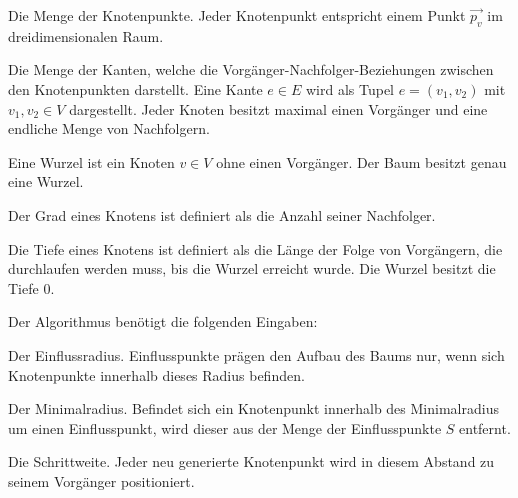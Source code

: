 \begin{description}[labelindent]
	\item[\boldmath$V$] Die Menge der Knotenpunkte. Jeder Knotenpunkt entspricht einem Punkt $\overrightarrow{p_v}$ im dreidimensionalen Raum. \cite[S.358]{ThI:14}\\
	
	\item[\boldmath$E$] Die Menge der Kanten, welche die Vorgänger-Nachfolger-Beziehungen zwischen den Knotenpunkten darstellt. Eine Kante $e \in E$ wird als Tupel $e = (v_1, v_2)$ mit $v_1, v_2 \in V$ dargestellt. Jeder Knoten besitzt maximal einen Vorgänger und eine endliche Menge von Nachfolgern.\cite[S.358]{ThI:14}\\
	
	\item[\boldmath$Wurzel$] Eine Wurzel ist ein Knoten $v \in V$ ohne einen Vorgänger. Der Baum besitzt genau eine Wurzel. \cite[S.358]{ThI:14}\\
	
	\item[\boldmath$Grad$] Der Grad eines Knotens ist definiert als die Anzahl seiner Nachfolger. \cite[S.29]{AlgoDat:14}\\
	
	\item[\boldmath$Tiefe$] Die Tiefe eines Knotens ist definiert als die Länge der Folge von Vorgängern, die durchlaufen werden muss, bis die Wurzel erreicht wurde. Die Wurzel besitzt die Tiefe $0$. \cite[S.30]{AlgoDat:14}
	
\end{description}
Der Algorithmus benötigt die folgenden Eingaben:

\begin{description}[labelindent]
	\item[\boldmath$d_i$] Der Einflussradius. Einflusspunkte prägen den Aufbau des Baums nur, wenn sich Knotenpunkte innerhalb dieses Radius befinden.\\
	
	\item[\boldmath$d_k$] Der Minimalradius. Befindet sich ein Knotenpunkt innerhalb des Minimalradius um einen Einflusspunkt, wird dieser aus der Menge der Einflusspunkte $S$ entfernt.\\
	
	\item[\boldmath$D$] Die Schrittweite. Jeder neu generierte Knotenpunkt wird in diesem Abstand zu seinem Vorgänger positioniert.

\end{description}
\cite[Abschn. 2]{SpaceColonizationAlgorithm:07}
